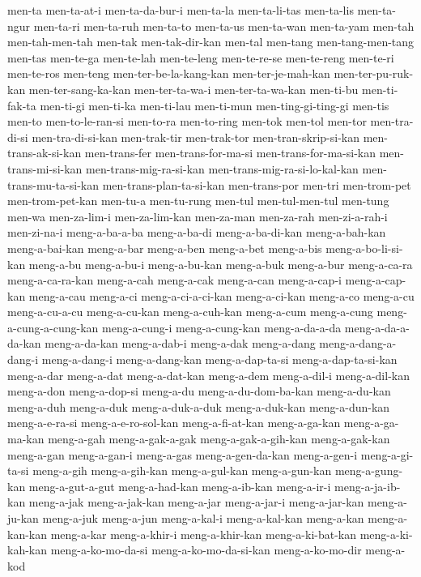 {men-ta men-ta-at-i men-ta-da-bur-i men-ta-la men-ta-li-tas men-ta-lis
men-ta-ngur men-ta-ri men-ta-ruh men-ta-to men-ta-us men-ta-wan men-ta-yam
men-tah men-tah-men-tah men-tak men-tak-dir-kan men-tal men-tang
men-tang-men-tang men-tas men-te-ga men-te-lah men-te-leng men-te-re-se
men-te-reng men-te-ri men-te-ros men-teng men-ter-be-la-kang-kan
men-ter-je-mah-kan men-ter-pu-ruk-kan men-ter-sang-ka-kan men-ter-ta-wa-i
men-ter-ta-wa-kan men-ti-bu men-ti-fak-ta men-ti-gi men-ti-ka men-ti-lau
men-ti-mun men-ting-gi-ting-gi men-tis men-to men-to-le-ran-si men-to-ra
men-to-ring men-tok men-tol men-tor men-tra-di-si men-tra-di-si-kan
men-trak-tir men-trak-tor men-tran-skrip-si-kan men-trans-ak-si-kan
men-trans-fer men-trans-for-ma-si men-trans-for-ma-si-kan
men-trans-mi-si-kan men-trans-mig-ra-si-kan men-trans-mig-ra-si-lo-kal-kan
men-trans-mu-ta-si-kan men-trans-plan-ta-si-kan men-trans-por men-tri
men-trom-pet men-trom-pet-kan men-tu-a men-tu-rung men-tul men-tul-men-tul
men-tung men-wa men-za-lim-i men-za-lim-kan men-za-man men-za-rah
men-zi-a-rah-i men-zi-na-i meng-a-ba-a-ba meng-a-ba-di meng-a-ba-di-kan
meng-a-bah-kan meng-a-bai-kan meng-a-bar meng-a-ben meng-a-bet meng-a-bis
meng-a-bo-li-si-kan meng-a-bu meng-a-bu-i meng-a-bu-kan meng-a-buk
meng-a-bur meng-a-ca-ra meng-a-ca-ra-kan meng-a-cah meng-a-cak meng-a-can
meng-a-cap-i meng-a-cap-kan meng-a-cau meng-a-ci meng-a-ci-a-ci-kan
meng-a-ci-kan meng-a-co meng-a-cu meng-a-cu-a-cu meng-a-cu-kan
meng-a-cuh-kan meng-a-cum meng-a-cung meng-a-cung-a-cung-kan meng-a-cung-i
meng-a-cung-kan meng-a-da-a-da meng-a-da-a-da-kan meng-a-da-kan
meng-a-dab-i meng-a-dak meng-a-dang meng-a-dang-a-dang-i meng-a-dang-i
meng-a-dang-kan meng-a-dap-ta-si meng-a-dap-ta-si-kan meng-a-dar
meng-a-dat meng-a-dat-kan meng-a-dem meng-a-dil-i meng-a-dil-kan
meng-a-don meng-a-dop-si meng-a-du meng-a-du-dom-ba-kan meng-a-du-kan
meng-a-duh meng-a-duk meng-a-duk-a-duk meng-a-duk-kan meng-a-dun-kan
meng-a-e-ra-si meng-a-e-ro-sol-kan meng-a-fi-at-kan meng-a-ga-kan
meng-a-ga-ma-kan meng-a-gah meng-a-gak-a-gak meng-a-gak-a-gih-kan
meng-a-gak-kan meng-a-gan meng-a-gan-i meng-a-gas meng-a-gen-da-kan
meng-a-gen-i meng-a-gi-ta-si meng-a-gih meng-a-gih-kan meng-a-gul-kan
meng-a-gun-kan meng-a-gung-kan meng-a-gut-a-gut meng-a-had-kan
meng-a-ib-kan meng-a-ir-i meng-a-ja-ib-kan meng-a-jak meng-a-jak-kan
meng-a-jar meng-a-jar-i meng-a-jar-kan meng-a-ju-kan meng-a-juk meng-a-jun
meng-a-kal-i meng-a-kal-kan meng-a-kan meng-a-kan-kan meng-a-kar
meng-a-khir-i meng-a-khir-kan meng-a-ki-bat-kan meng-a-ki-kah-kan
meng-a-ko-mo-da-si meng-a-ko-mo-da-si-kan meng-a-ko-mo-dir meng-a-kod
}
